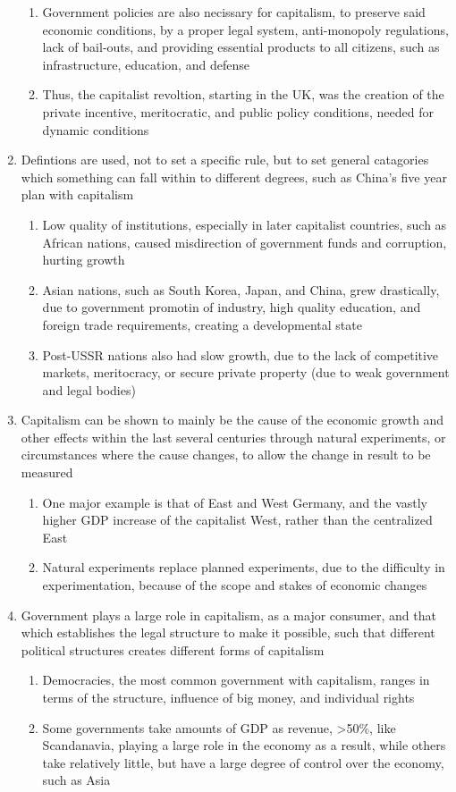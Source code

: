 \documentclass[11 pt, twoside]{article}
\begin{document}
\begin{enumerate}
\begin{enumerate}
\item Government policies are also necissary for capitalism, to preserve said economic conditions, by a proper legal system, anti-monopoly regulations, lack of bail-outs, and providing essential products to all citizens, such as infrastructure, education, and defense
\item Thus, the capitalist revoltion, starting in the UK, was the creation of the private incentive, meritocratic, and public policy conditions, needed for dynamic conditions
\end{enumerate}
\item Defintions are used, not to set a specific rule, but to set general catagories which something can fall within to different degrees, such as China's five year plan with capitalism
\begin{enumerate}
\item Low quality of institutions, especially in later capitalist countries, such as African nations, caused misdirection of government funds and corruption, hurting growth
\item Asian nations, such as South Korea, Japan, and China, grew drastically, due to government promotin of industry, high quality education, and foreign trade requirements, creating a developmental state
\item Post-USSR nations also had slow growth, due to the lack of competitive markets, meritocracy, or secure private property (due to weak government and legal bodies)
\end{enumerate}
\item Capitalism can be shown to mainly be the cause of the economic growth and other effects within the last several centuries through natural experiments, or circumstances where the cause changes, to allow the change in result to be measured
\begin{enumerate}
\item One major example is that of East and West Germany, and the vastly higher GDP increase of the capitalist West, rather than the centralized East
\item Natural experiments replace planned experiments, due to the difficulty in experimentation, because of the scope and stakes of economic changes
\end{enumerate}
\item Government plays a large role in capitalism, as a major consumer, and that which establishes the legal structure to make it possible, such that different political structures creates different forms of capitalism
\begin{enumerate}
\item Democracies, the most common government with capitalism, ranges in terms of the structure, influence of big money, and individual rights
\item Some governments take amounts of GDP as revenue, >50\%, like Scandanavia, playing a large role in the economy as a result, while others take relatively little, but have a large degree of control over the economy, such as Asia
\end{enumerate}
\end{enumerate}
\end{document}
